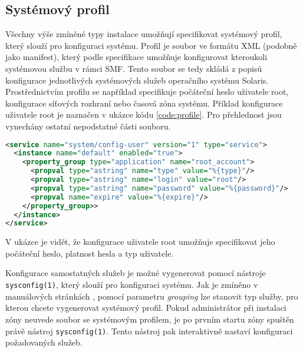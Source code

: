 \subsection{Systémový profil}
\label{chapter:zones:instalation:profile}
Všechny výše zmíněné typy instalace umožňují specifikovat systémový profil, který slouží pro konfiguraci systému. Profil je soubor
ve formátu XML (podobně jako manifest), který podle specifikace \cite{oracle:solaris:zones:profile} umožňuje konfigurovat
kteroukoli systémovou službu v rámci SMF. Tento soubor se tedy skládá z popisů konfigurace jednotlivých systémových služeb
operačního systému Solaris. Prostřednictvím profilu se například specifikuje počáteční heslo uživatele root, konfigurace 
síťových rozhraní nebo časová zóna systému. Příklad konfigurace uživatele root je naznačen v ukázce kódu \ref{code:profile}.
Pro přehlednost jsou vynechány ostatní nepodstatné části souboru.
\begin{lstlisting}[language={XML}, caption={Konfigurace uživatele root}, label={code:profile}]
<service name="system/config-user" version="1" type="service">
  <instance name="default" enabled="true">
    <property_group type="application" name="root_account">
      <propval type="astring" name="type" value="%{type}"/>
      <propval type="astring" name="login" value="root"/>
      <propval type="astring" name="password" value="%{password}"/>
      <propval name="expire" value="%{expire}"/>
    </property_group>>
  </instance>
</service>
\end{lstlisting}
V ukázce je vidět, že konfigurace uživatele root umožňuje specifikovat jeho počáteční heslo, platnost hesla a typ uživatele.

Konfigurace samostatných služeb je možné vygenerovat pomocí nástroje \verb|sysconfig(1)|, který slouží pro konfiguraci systému.
Jak je zmíněno v manuálových stránkách \cite{oracle:manpages:sysconfig}, pomocí parametru \textit{grouping} lze stanovit typ
služby, pro kterou chcete vygenerovat systémový profil. Pokud administrátor při instalaci zóny neuvede soubor se systémovým
profilem, je po prvním startu zóny spuštěn právě nástroj \verb|sysconfig(1)|. Tento nástroj pak interaktivně nastaví konfiguraci
požadovaných služeb.
